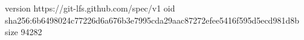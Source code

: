 version https://git-lfs.github.com/spec/v1
oid sha256:6b6498024c77226d6a676b3e7995cda29aac87272efee5416f595d5ecd981d8b
size 94282
